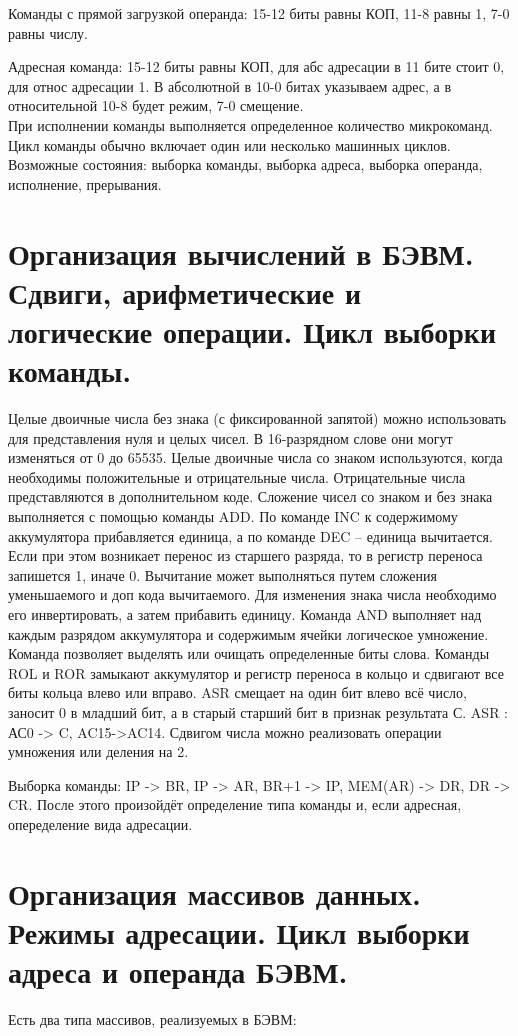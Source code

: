 \documentclass{article}
\begin{document}
Команды с прямой загрузкой операнда: 15-12 биты равны КОП, 11-8 равны 1, 7-0 равны числу.


Адресная команда: 15-12 биты равны КОП, для абс адресации в 11 бите стоит 0, для относ адресации 1. В абсолютной в 10-0 битах указываем адрес, а в относительной 10-8 будет режим, 7-0 смещение.\\


При исполнении команды выполняется определенное количество микрокоманд. Цикл команды обычно включает один или несколько машинных циклов. 
Возможные состояния: выборка команды, выборка адреса, выборка операнда, исполнение, прерывания.



\section{Организация вычислений в БЭВМ. Сдвиги, арифметические и логические операции. Цикл выборки команды.}
Целые двоичные числа без знака (с фиксированной запятой) можно использовать для представления нуля и целых чисел. 
В 16-разрядном слове они могут изменяться от 0 до 65535. Целые двоичные числа со знаком используются, когда необходимы положительные и отрицательные числа. 
Отрицательные числа представляются в дополнительном коде. Сложение чисел со знаком
и без знака выполняется с помощью команды ADD. По команде INC к содержимому
аккумулятора прибавляется единица, а по команде DEC – единица вычитается. Если при этом
возникает перенос из старшего разряда, то в регистр переноса запишется 1, иначе 0. 
Вычитание может выполняться путем сложения уменьшаемого и доп
кода вычитаемого. Для изменения знака числа необходимо его инвертировать,
а затем прибавить единицу. Команда AND выполняет над каждым разрядом аккумулятора и содержимым ячейки логическое умножение. 
Команда позволяет выделять или очищать определенные биты слова. Команды ROL и ROR замыкают аккумулятор и
регистр переноса в кольцо и сдвигают все биты кольца влево или вправо. ASR смещает на один бит влево всё число, заносит 0 в младший бит, а в старый старший бит в признак результата С. 
ASR : АС0 -> C, AC15->AC14. Сдвигом числа можно реализовать операции умножения или деления на 2.


Выборка команды: IP -> BR, IP -> AR, BR+1 -> IP, MEM(AR) -> DR, DR -> CR. После этого произойдёт определение типа команды и, если адресная, опеределение вида адресации.





\section{Организация массивов данных. Режимы адресации. Цикл выборки адреса и операнда БЭВМ.}
Есть два типа массивов, реализуемых в БЭВМ:
\end{document}
